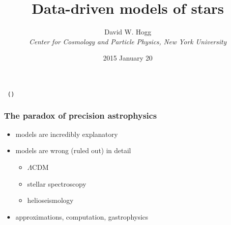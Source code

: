 \documentclass[pdftex]{beamer}
\title{Data-driven models of stars}
\author[David W. Hogg (NYU)]{David W. Hogg \\
  \textsl{\small Center for Cosmology and Particle Physics,
                 New York University}}
\date{2015 January 20}
\begin{document}
\begin{frame}
  \titlepage
  \texttt{\githash~(\gitdate)}
\end{frame}

\begin{frame}
  \frametitle{The paradox of precision astrophysics}
  \begin{itemize}
  \item models are incredibly explanatory
  \item models are wrong (ruled out) in detail
    \begin{itemize}
    \item $\Lambda$CDM
    \item stellar spectroscopy
    \item helioseismology
    \end{itemize}
  \item approximations, computation, gastrophysics
  \end{itemize}
\end{frame}
\end{document}
